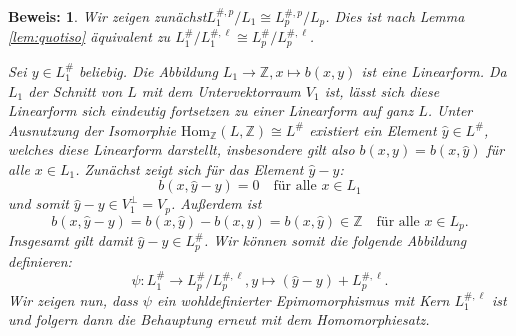 \documentclass[12pt,a4paper,halfparskip,headsepline,bibtotocnumbered]{scrreprt}
\theoremstyle{nummermitklammern}
\theoremstyle{nonumberbreak}
\newtheorem{beweis}{Beweis:}
\newcommand{\Z}{\mathbb{Z}}
\begin{document}
\begin{beweis}
	Wir zeigen zunächst$ L_1^{\#,p} / L_1  \cong L_p^{\#,p} / L_p$. Dies ist nach Lemma \eqref{lem:quotiso} äquivalent zu $L_1^\# / L_1^{\#,\ell} \cong L_p^\# / L_p^{\#, \ell}$.\par
	Sei $y \in L_1^\#$ beliebig. Die Abbildung $L_1 \rightarrow \Z, x \mapsto b(x,y)$ ist eine Linearform. Da $L_1$ der Schnitt von $L$ mit dem Untervektorraum $V_1$ ist, lässt sich diese Linearform sich eindeutig fortsetzen zu einer Linearform auf ganz $L$. Unter Ausnutzung der Isomorphie $\text{Hom}_\Z(L, \Z) \cong L^\#$ existiert ein Element $\hat{y} \in L^\#$, welches diese Linearform darstellt, insbesondere gilt also $b(x,y) = b(x, \hat{y})$ für alle $x \in L_1$. Zunächst zeigt sich für das Element $\hat{y} - y$:
	\begin{equation*}
		b(x, \hat{y} - y) = 0 \quad \text{für alle } x \in L_1
	\end{equation*}
	und somit $\hat{y} - y \in V_1^\perp = V_p$. Außerdem ist
	\begin{equation*}
		b(x, \hat{y} - y) = b(x, \hat{y}) - b(x,y) = b(x, \hat{y}) \in \Z \quad \text{für alle } x \in L_p.
	\end{equation*}
	Insgesamt gilt damit $\hat{y} - y \in L_p^\#$. Wir können somit die folgende Abbildung definieren:
	\begin{equation*}
		\psi: L_1^\# \rightarrow L_p^\# / L_p^{\#, \ell}, y \mapsto (\hat{y} - y) + L_p^{\#, \ell}.
	\end{equation*}
	Wir zeigen nun, dass $\psi$ ein wohldefinierter Epimomorphismus mit Kern $L_1^{\#, \ell}$ ist und folgern dann die Behauptung erneut mit dem Homomorphiesatz.
	

\end{beweis}
\end{document}
